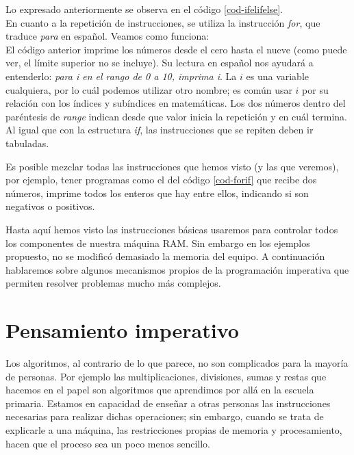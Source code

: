 Lo expresado anteriormente se observa en el código \ref{cod-ifelifelse}.  \\



En cuanto a la repetición de instrucciones, se utiliza la instrucción \emph{for}, que traduce \emph{para} en español. Veamos como funciona: \\



El código anterior imprime los números desde el cero hasta el nueve (como puede ver, el límite superior no se incluye). Su lectura en español nos ayudará a entenderlo: \emph{para i en el rango de 0 a 10, imprima i}. La $i$ es una variable cualquiera, por lo cuál podemos utilizar otro nombre; es común usar $i$ por su relación con los índices y subíndices en matemáticas. Los dos números dentro del paréntesis de \emph{range} indican desde que valor inicia la repetición y en cuál termina. Al igual que con la estructura \emph{if}, las instrucciones que se repiten deben ir tabuladas.

Es posible mezclar todas las instrucciones que hemos visto (y las que veremos), por ejemplo, tener programas como el del código \ref{cod-forif} que recibe dos números, imprime todos los enteros que hay entre ellos, indicando si son negativos o positivos.




Hasta aquí hemos visto las instrucciones básicas usaremos para controlar todos los componentes de nuestra máquina RAM. Sin embargo en los ejemplos propuesto, no se modificó demasiado la memoria del equipo. A continuación hablaremos sobre algunos mecanismos propios de la programación imperativa que permiten resolver problemas mucho más complejos.



\section{Pensamiento imperativo}

Los algoritmos, al contrario de lo que parece, no son complicados para la mayoría de personas. Por ejemplo las multiplicaciones, divisiones, sumas y restas que hacemos en el papel son algoritmos que aprendimos por allá en la escuela primaria. Estamos en capacidad de enseñar a otras personas las instrucciones necesarias para realizar dichas operaciones; sin embargo, cuando se trata de explicarle a una máquina, las restricciones propias de memoria y procesamiento, hacen que el proceso sea un poco menos sencillo.

